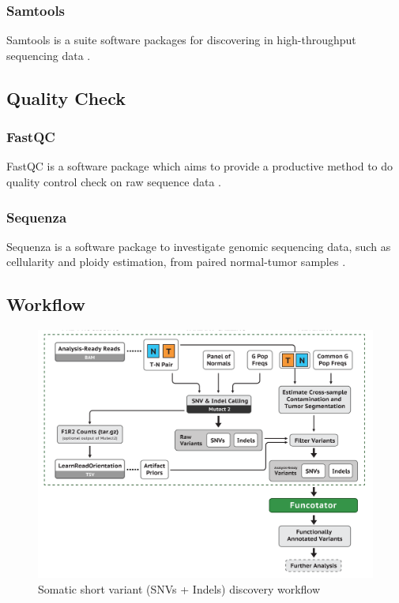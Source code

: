 \documentclass[a4paper]{article}
\begin{document}
            \subsubsection{Samtools}
                Samtools is a suite software packages for discovering in high-throughput sequencing data \cite{samtools1}.

        \subsection{Quality Check}
            \subsubsection{FastQC}
                FastQC is a software package which aims to provide a productive method to do quality control check on raw sequence data \cite{fastqc1}.

            \subsubsection{Sequenza}
                Sequenza is a software package to investigate genomic sequencing data, such as cellularity and ploidy estimation, from paired normal-tumor samples \cite{sequenza1}.

        \subsection{Workflow}

            \begin{figure}[p]
                \centering
                \includegraphics[width=0.6 \linewidth]{figures/Workflow/somatic_short_variants.png}
                \caption{Somatic short variant (SNVs + Indels) discovery workflow \protect\cite{gatk1, gatk2}}
            \end{figure}
\end{document}
